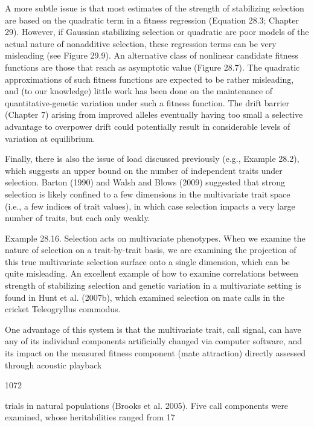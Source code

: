 \documentclass{article}
\begin{document}
A more subtle issue is that most estimates of the strength of stabilizing selection are based on the quadratic term in a fitness regression (Equation 28.3; Chapter 29). However, if Gaussian stabilizing selection or quadratic are poor models of the actual nature of nonadditive selection, these regression terms can be very misleading (see Figure 29.9). An alternative class of nonlinear candidate fitness functions are those that reach as asymptotic value (Figure 28.7). The quadratic approximations of such fitness functions are expected to be rather misleading, and (to our knowledge) little work has been done on the maintenance of quantitative-genetic variation under such a fitness function. The drift barrier (Chapter 7) arising from improved alleles eventually having too small a selective advantage to overpower drift could potentially result in considerable levels of variation at equilibrium.

Finally, there is also the issue of load discussed previously (e.g., Example 28.2), which suggests an upper bound on the number of independent traits under selection. Barton (1990) and Walsh and Blows (2009) suggested that strong selection is likely confined to a few dimensions in the multivariate trait space (i.e., a few indices of trait values), in which case selection impacts a very large number of traits, but each only weakly.

Example 28.16. Selection acts on multivariate phenotypes. When we examine the nature of selection on a trait-by-trait basis, we are examining the projection of this true multivariate selection surface onto a single dimension, which can be quite misleading. An excellent example of how to examine correlations between strength of stabilizing selection and genetic variation in a multivariate setting is found in Hunt et al. (2007b), which examined selection on mate calls in the cricket Teleogryllus commodus.

One advantage of this system is that the multivariate trait, call signal, can have any of its individual components artificially changed via computer software, and its impact on the measured fitness component (mate attraction) directly assessed through acoustic playback

1072

trials in natural populations (Brooks et al. 2005). Five call components were examined, whose heritabilities ranged from 17%
\end{document}
